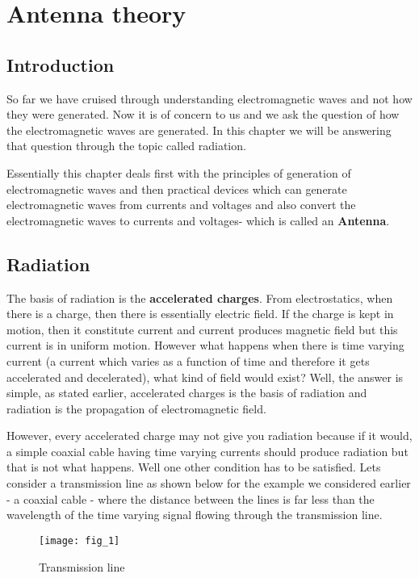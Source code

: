 	\chapter{Antenna theory}
\section{Introduction}	

So far we have cruised through understanding electromagnetic waves and not how they were generated. Now it is of concern to us and we ask the question of how the electromagnetic waves are generated. In this chapter we will be answering that question through the topic called radiation. 

Essentially this chapter deals first with the principles of generation of electromagnetic waves and then practical devices which can generate electromagnetic waves from currents and voltages and also convert the electromagnetic waves to currents and voltages- which is called an \textbf{Antenna}.

\section{Radiation}
The basis of radiation is the \textbf{accelerated charges}. From electrostatics, when there is a charge, then there is essentially electric field. If the charge is kept in motion, then it constitute current and current produces magnetic field but this current is in uniform motion. However what happens when there is time varying current (a current which varies as a function of time and therefore it gets accelerated and decelerated), what kind of field would exist? Well, the answer is simple, as stated earlier, accelerated charges is the basis of radiation and radiation is the propagation of electromagnetic field.

However, every accelerated charge may not give you radiation because if it would, a simple coaxial cable having time varying currents should produce radiation but that is not what happens. Well one other condition has to be satisfied. Lets consider a transmission line as shown below for the example we considered earlier - a coaxial cable - where the distance between the lines is far less than the wavelength of the time varying signal flowing through the transmission line.

\begin{figure}
	\centering
	\texttt{[image: fig\_1]}
	\caption{Transmission line}
\end{figure}

